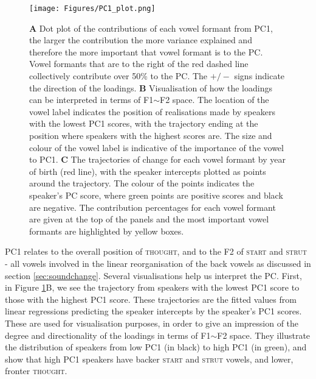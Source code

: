 \documentclass[review]{elsarticle} %
\begin{document}
\begin{figure}[!p]
\texttt{[image: Figures/PC1\_plot.png]}
\caption{\textbf{A} Dot plot of the contributions of each vowel formant from PC1, the larger the contribution the more variance explained and therefore the more important that vowel formant is to the PC. Vowel formants that are to the right of the red dashed line collectively contribute over 50\% to the PC. The $+/-$ signs indicate the direction of the loadings. \textbf{B} Visualisation of how the loadings can be interpreted in terms of F1$\sim$F2 space. The location of the vowel label indicates the position of realisations made by speakers with the lowest PC1 scores, with the trajectory ending at the position where speakers with the highest scores are. The size and colour of the vowel label is indicative of the importance of the vowel to PC1. \textbf{C} The trajectories of change for each vowel formant by year of birth (red line), with the speaker intercepts plotted as points around the trajectory. The colour of the points indicates the speaker's PC score, where green points are positive scores and black are negative. The contribution percentages for each vowel formant are given at the top of the panels and the most important vowel formants are highlighted by yellow boxes.}
\label{fig:PC1_variable_loadings}
\end{figure}


PC1 relates to the overall position of \textsc{thought}, and to the F2 of \textsc{start} and \textsc{strut} - all vowels involved in the linear reorganisation of the back vowels as discussed in section \ref{sec:soundchange}.  Several visualisations help us interpret the PC.  First, in Figure \ref{fig:PC1_variable_loadings}B, we see the trajectory from speakers with the lowest PC1 score to those with the highest PC1 score.  These trajectories are the fitted values from linear regressions predicting the speaker intercepts by the speaker's PC1 scores. These are used for visualisation purposes, in order to give an impression of the degree and directionality of the loadings in terms of F1$\sim$F2 space.  They illustrate the distribution of speakers from low PC1 (in black) to high PC1 (in green), and show that high PC1 speakers have backer \textsc{start} and  \textsc{strut} vowels, and lower, fronter \textsc{thought}. 

\end{document}
